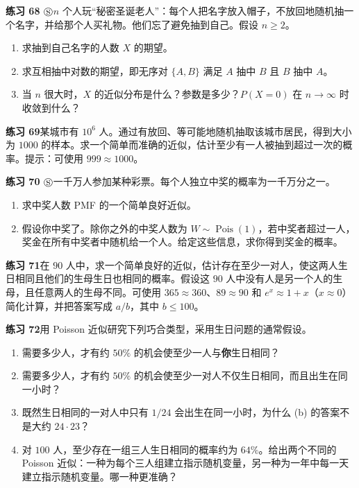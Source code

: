 \documentclass[UTF8, 12pt, fontset=fandol, oneside]{ctexart}
\begin{document}
\noindent\textbf{练习 68 $\circledS$}\quad $n$ 个人玩“秘密圣诞老人”：每个人把名字放入帽子，不放回地随机抽一个名字，并给那个人买礼物。他们忘了避免抽到自己。假设 $n\ge2$。
\begin{enumerate}
  \item[(a)] 求抽到自己名字的人数 $X$ 的期望。
  \item[(b)] 求互相抽中对数的期望，即无序对 $\{A,B\}$ 满足 $A$ 抽中 $B$ 且 $B$ 抽中 $A$。
  \item[(c)] 当 $n$ 很大时，$X$ 的近似分布是什么？参数是多少？$P(X=0)$ 在 $n\to\infty$ 时收敛到什么？
\end{enumerate}

\noindent\textbf{练习 69}\quad 某城市有 $10^6$ 人。通过有放回、等可能地随机抽取该城市居民，得到大小为 $1000$ 的样本。求一个简单而准确的近似，估计至少有一人被抽到超过一次的概率。提示：可使用 $999\approx 1000$。

\noindent\textbf{练习 70 $\circledS$}\quad 一千万人参加某种彩票。每个人独立中奖的概率为一千万分之一。
\begin{enumerate}
  \item[(a)] 求中奖人数 PMF 的一个简单良好近似。
  \item[(b)] 假设你中奖了。除你之外的中奖人数为 $W\sim\operatorname{Pois}(1)$，若中奖者超过一人，奖金在所有中奖者中随机给一个人。给定这些信息，求你得到奖金的概率。
\end{enumerate}

\noindent\textbf{练习 71}\quad 在 $90$ 人中，求一个简单良好的近似，估计存在至少一对人，使这两人生日相同且他们的生母生日也相同的概率。假设这 $90$ 人中没有人是另一个人的生母，且任意两人的生母不同。可使用 $365\approx 360$、$89\approx90$ 和 $e^x\approx1+x$（$x\approx0$）简化计算，并把答案写成 $a/b$，其中 $b\le100$。

\noindent\textbf{练习 72}\quad 用 Poisson 近似研究下列巧合类型，采用生日问题的通常假设。
\begin{enumerate}
  \item[(a)] 需要多少人，才有约 $50\%$ 的机会使至少一人与\textbf{你}生日相同？
  \item[(b)] 需要多少人，才有约 $50\%$ 的机会使至少一对人不仅生日相同，而且出生在同一小时？
  \item[(c)] 既然生日相同的一对人中只有 $1/24$ 会出生在同一小时，为什么 (b) 的答案不是大约 $24\cdot 23$？
  \item[(d)] 对 $100$ 人，至少存在一组三人生日相同的概率约为 $64\%$。给出两个不同的 Poisson 近似：一种为每个三人组建立指示随机变量，另一种为一年中每一天建立指示随机变量。哪一种更准确？
\end{enumerate}
\end{document}
